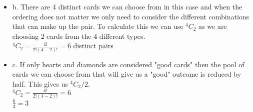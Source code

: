 \documentclass[11pt]{article}
\newcommand*{\Comb}[2]{{}^{#1}C_{#2}}%
\begin{document}
\begin{itemize}
\begin{itemize}
  	\item b. There are 4 distinct cards we can choose from in this case and when the ordering does not matter we only need to consider the different combinations that can make up the pair. To calculate this we can use $\Comb42$ as we are choosing 2 cards from the 4 different types.\\
  	$\Comb42=\frac{4!}{2!(4-2)!}=6$ distinct pairs\\
  	\item c. If only hearts and diamonds are considered "good cards" then the pool of cards we can choose from that will give us a "good" outcome is reduced by half. This gives us $\Comb42 / 2.$\\
  	$\Comb42=\frac{4!}{2!(4-2)!}=6$\\$\frac{6}{2}=3$
  \end{itemize}
\end{itemize}
\end{document}
